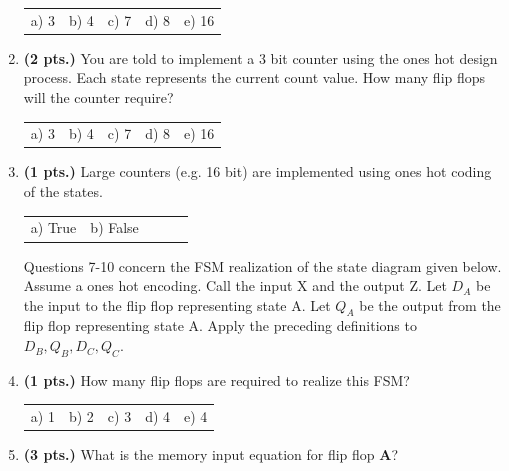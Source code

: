 \documentclass{article}
\begin{document}
\begin{enumerate}
\begin{tabular}{p{0.75in}p{0.75in}p{0.75in}p{0.75in}p{0.75in}}
a) 3 & b) 4 & c) 7 & d) 8 & e) 16 \\
\end{tabular}

\item {\bf (2 pts.)} You are told to implement a 3 bit counter using the
ones hot design process.  Each state represents the current count value. 
How many flip flops will the counter require?

\begin{tabular}{p{0.75in}p{0.75in}p{0.75in}p{0.75in}p{0.75in}}
a) 3 & b) 4 & c) 7 & d) 8 & e) 16 \\
\end{tabular}

\item {\bf (1 pts.)} Large counters (e.g. 16 bit) are implemented using ones hot 
coding of the states.

\begin{tabular}{p{0.75in}p{0.75in}p{0.75in}p{0.75in}p{0.75in}}
a) True & b) False  &      &      &      \\
\end{tabular}

Questions 7-10 concern the FSM realization of the state diagram given below.
Assume a ones hot encoding.  Call the input X and the output Z.  Let $D_A$ 
be the input to the
flip flop representing state A.  Let $Q_A$ be the output from the flip flop 
representing state A.  Apply the preceding definitions to $D_B, Q_B, D_C, Q_C$.

\item {\bf (1 pts.)} How many flip flops are required to realize this FSM?

\begin{tabular}{p{0.75in}p{0.75in}p{0.75in}p{0.75in}p{0.75in}}
a) 1 & b) 2 & c) 3 & d) 4 & e) 4 \\
\end{tabular}

\item {\bf (3 pts.)} What is the memory input equation for flip flop {\bf A}?


\end{enumerate}
\end{document}
